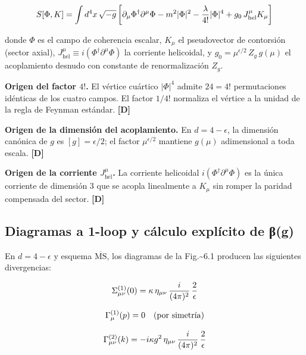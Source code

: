 ﻿\documentclass[11pt,letterpaper]{article}
\begin{document}
\begin{equation*}
  \resizebox{\ifdim\width>\linewidth \linewidth\else\width\fi}{!}{$\displaystyle S[\Phi, K] = \int d^4x\,\sqrt{-g}\left[\partial_\mu \Phi^\dagger \partial^\mu \Phi - m^2 |\Phi|^2 - \frac{\lambda}{4!}|\Phi|^4 + g_0\, J_{\text{hel}}^\mu K_\mu\right]$}
\end{equation*}

donde $\Phi$ es el campo de coherencia escalar, $K_\mu$ el pseudovector de contorsión (sector axial), $J_{\text{hel}}^\mu \equiv i(\Phi^\dagger \partial^\mu \Phi)$ la corriente helicoidal, y $g_0 = \mu^{\epsilon/2}\,Z_g\,g(\mu)$ el acoplamiento desnudo con constante de renormalización $Z_g$.

\textbf{Origen del factor $4!$.} El vértice cuártico $|\Phi|^4$ admite $24 = 4!$ permutaciones idénticas de los cuatro campos. El factor $1/4!$ normaliza el vértice a la unidad de la regla de Feynman estándar. \textbf{[D]}

\textbf{Origen de la dimensión del acoplamiento.} En $d = 4 - \epsilon$, la dimensión canónica de $g$ es $[g] = \epsilon/2$; el factor $\mu^{\epsilon/2}$ mantiene $g(\mu)$ adimensional a toda escala. \textbf{[D]}

\textbf{Origen de la corriente $J_{\text{hel}}^\mu$.} La corriente helicoidal $i(\Phi^\dagger \partial^\mu \Phi)$ es la única corriente de dimensión 3 que se acopla linealmente a $K_\mu$ sin romper la paridad compensada del sector. \textbf{[D]}
\subsection{Diagramas a 1-loop y cálculo explícito de β(g)}
En $d = 4 - \epsilon$ y esquema $\overline{\text{MS}}$, los diagramas de la Fig.\textasciitilde{}6.1 producen las siguientes divergencias:

\begin{equation*}
  \resizebox{\ifdim\width>\linewidth \linewidth\else\width\fi}{!}{$\displaystyle \Sigma_{\mu\nu}^{(1)}(0) = \kappa\,\eta_{\mu\nu}\,\frac{i}{(4\pi)^2}\,\frac{2}{\epsilon}$}
\end{equation*}

\begin{equation*}
  \resizebox{\ifdim\width>\linewidth \linewidth\else\width\fi}{!}{$\displaystyle \Gamma_\mu^{(1)}(p) = 0 \quad \text{(por simetría)}$}
\end{equation*}

\begin{equation*}
  \resizebox{\ifdim\width>\linewidth \linewidth\else\width\fi}{!}{$\displaystyle \Gamma_{\mu\nu}^{(2)}(k) = -i\kappa g^2\,\eta_{\mu\nu}\,\frac{i}{(4\pi)^2}\,\frac{2}{\epsilon}$}
\end{equation*}
\end{document}
